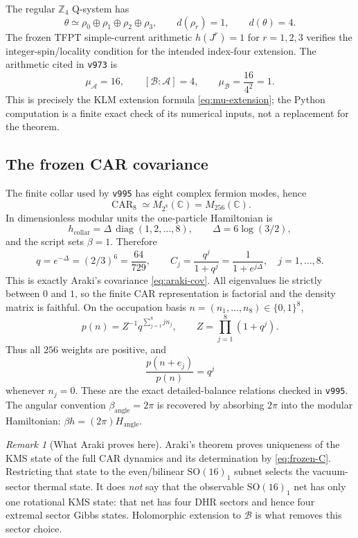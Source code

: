 \documentclass[11pt]{article}
\theoremstyle{remark}
\newtheorem{remark}[theorem]{Remark}
\newcommand{\A}{\mathcal A}
\newcommand{\B}{\mathcal B}
\newcommand{\C}{\mathbb C}
\newcommand{\Z}{\mathbb Z}
\newcommand{\CAR}{\operatorname{CAR}}
\begin{document}
The regular $\Z_4$ Q-system has
\[
 \theta\simeq\rho_0\oplus\rho_1\oplus\rho_2\oplus\rho_3,
\qquad d(\rho_r)=1,\qquad d(\theta)=4.
\tag{3.4}\label{eq:regular-q}
\]
The frozen TFPT simple-current arithmetic
$h(J^r)=1$ for $r=1,2,3$ verifies the integer-spin/locality condition
for the intended index-four extension.  The arithmetic cited in
\texttt{v973} is
\[
 \mu_{\A}=16,\qquad [\B:\A]=4,\qquad
 \mu_{\B}=\frac{16}{4^2}=1.
\tag{3.5}\label{eq:tfpt-mu}
\]
This is precisely the KLM extension formula
\eqref{eq:mu-extension}; the Python computation is a finite exact
check of its numerical inputs, not a replacement for the theorem.

\subsection{The frozen CAR covariance}

The finite collar used by \texttt{v995} has eight complex fermion
modes, hence
\[
 \CAR_8\simeq M_{2^8}(\C)=M_{256}(\C).
\]
In dimensionless modular units the one-particle Hamiltonian is
\[
 h_{\mathrm{collar}}
 =\Delta\,\operatorname{diag}(1,2,\ldots,8),
\qquad
 \Delta=6\log(3/2),
\tag{3.6}\label{eq:collar-h}
\]
and the script sets $\beta=1$.  Therefore
\[
 q=e^{-\Delta}=(2/3)^6=\frac{64}{729},
\qquad
 C_j=\frac{q^j}{1+q^j}
 =\frac1{1+e^{j\Delta}},\quad j=1,\ldots,8.
\tag{3.7}\label{eq:frozen-C}
\]
This is exactly Araki's covariance
\eqref{eq:araki-cov}.  All eigenvalues lie strictly between $0$ and
$1$, so the finite CAR representation is factorial and the density
matrix is faithful.  On the occupation basis
$n=(n_1,\ldots,n_8)\in\{0,1\}^8$,
\[
 p(n)=Z^{-1}q^{\sum_{j=1}^{8}jn_j},
\qquad
 Z=\prod_{j=1}^{8}(1+q^j).
\tag{3.8}\label{eq:gibbs-weights}
\]
Thus all $256$ weights are positive, and
\[
 \frac{p(n+e_j)}{p(n)}=q^j
\]
whenever $n_j=0$.  These are the exact detailed-balance relations
checked in \texttt{v995}.  The angular convention
$\beta_{\mathrm{angle}}=2\pi$ is recovered by absorbing $2\pi$ into
the modular Hamiltonian: $\beta h=(2\pi)H_{\mathrm{angle}}$.

\begin{remark}[What Araki proves here]
Araki's theorem proves uniqueness of the KMS state of the full CAR
dynamics and its determination by \eqref{eq:frozen-C}.  Restricting
that state to the even/bilinear $\mathrm{SO}(16)_1$ subnet selects the
vacuum-sector thermal state.  It does \emph{not} say that the
observable $\mathrm{SO}(16)_1$ net has only one rotational KMS state:
that net has four DHR sectors and hence four extremal sector Gibbs
states.  Holomorphic extension to $\B$ is what removes this sector
choice.
\end{remark}
\end{document}
